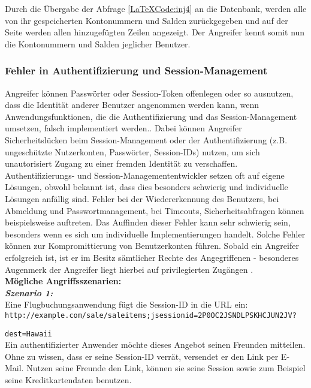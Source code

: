Durch die Übergabe der Abfrage \ref{LaTeXCode:inj4} an die Datenbank, werden alle von ihr gespeicherten Kontonummern und Salden zurückgegeben und auf der Seite werden allen hinzugefügten Zeilen angezeigt. Der Angreifer kennt somit nun die Kontonummern und Salden jeglicher Benutzer.

\subsubsection{Fehler in Authentifizierung und Session-Management}

Angreifer können Passwörter oder Session-Token offenlegen oder so ausnutzen, dass die Identität anderer Benutzer angenommen werden kann, wenn Anwendungsfunktionen, die die Authentifizierung und das Session-Management umsetzen, falsch implementiert werden.\cite[6]{owasp17top10}. Dabei können Angreifer Sicherheitslücken beim Session-Management oder der Authentifizierung (z.B. ungeschützte Nutzerkonten, Passwörter, Session-IDs) nutzen, um sich unautorisiert Zugang zu einer fremden Identität zu verschaffen. Authentifizierungs- und Session-Managemententwickler setzen oft auf eigene Lösungen, obwohl bekannt ist, dass dies besonders schwierig und individuelle Lösungen anfällig sind. Fehler bei der Wiedererkennung des Benutzers, bei Abmeldung und Passwortmanagement, bei Timeouts, Sicherheitsabfragen können beispielsweise auftreten. Das Auffinden dieser Fehler kann sehr schwierig sein, besonders wenn es sich um individuelle Implementierungen handelt. Solche Fehler können zur Kompromittierung von Benutzerkonten führen. Sobald ein Angreifer erfolgreich ist, ist er im Besitz sämtlicher Rechte des Angegriffenen - besonderes Augenmerk der Angreifer liegt hierbei auf privilegierten Zugängen \cite[8]{owasp17top10}.\\

\textbf{Mögliche Angriffsszenarien:}\\

\textbf{\textit{Szenario 1:}}\\
 Eine Flugbuchungsanwendung fügt die Session-ID in die URL ein\cite[8]{owasp17top10}:\\


\texttt{http://example.com/sale/saleitems;jsessionid=2P0OC2JSNDLPSKHCJUN2JV?}

\texttt{dest=Hawaii}\\

Ein authentifizierter Anwender möchte dieses Angebot seinen Freunden mitteilen. Ohne zu wissen, dass er seine Session-ID verrät, versendet er den Link per E-Mail. Nutzen seine Freunde den Link, können sie seine Session sowie zum Beispiel seine Kreditkartendaten benutzen.\\

